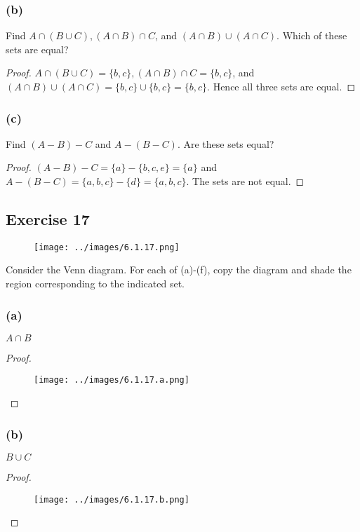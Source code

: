 \documentclass[14pt]{extarticle}
\begin{document}
\subsubsection{(b)}
Find \(A \cap (B \cup C), (A \cap B) \cap C\), and \((A \cap B) \cup (A \cap C)\). Which of these sets are equal?

\begin{proof}
  \(A \cap (B \cup C ) = \{b, c\}, (A \cap B) \cap C =
  \{b, c\}\),
  and \((A \cap B) \cup (A \cap C ) = \{b, c\} \cup \{b, c\} = \{b, c\}\).
  Hence all three sets are equal.
\end{proof}

\subsubsection{(c)}
Find \((A - B) - C\) and \(A - (B - C)\). Are these sets equal?

\begin{proof}
  \((A - B) - C = \{a\} - \{b, c, e\} = \{a\}\) and \(A - (B - C) = \{a, b, c\} - \{d\} = \{a, b, c\}\).
  The sets are not equal.
\end{proof}

\subsection{Exercise 17}
\begin{figure}[ht!]
  \centering
  \texttt{[image: ../images/6.1.17.png]}
\end{figure}
Consider the Venn diagram. For each of (a)-(f), copy the diagram and shade the region corresponding to the indicated set.

\subsubsection{(a)}
$A \cap B$

\begin{proof}
  \begin{figure}[ht!]
    \centering
    \texttt{[image: ../images/6.1.17.a.png]}
  \end{figure}
\end{proof}

\subsubsection{(b)}
$B \cup C$

\begin{proof}
  \begin{figure}[ht!]
    \centering
    \texttt{[image: ../images/6.1.17.b.png]}
  \end{figure}
\end{proof}
\end{document}
